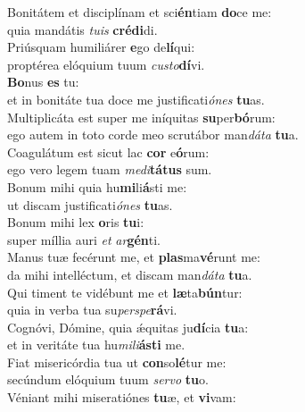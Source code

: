 \evenverse Bonitátem et disciplínam et sci\textbf{én}tiam \textbf{do}ce me:~\*\\
\evenverse quia mandátis \textit{tu}\textit{is} \textbf{cré}\textbf{di}di.\\
\oddverse Priúsquam humiliárer \textbf{e}go de\textbf{lí}qui:~\*\\
\oddverse proptérea elóquium tuum \textit{cu}\textit{sto}\textbf{dí}vi.\\
\evenverse \textbf{Bo}nus \textbf{es} tu:~\*\\
\evenverse et in bonitáte tua doce me justificati\textit{ó}\textit{nes} \textbf{tu}as.\\
\oddverse Multiplicáta est super me iníquitas \textbf{su}per\textbf{bó}rum:~\*\\
\oddverse ego autem in toto corde meo scrutábor man\textit{dá}\textit{ta} \textbf{tu}a.\\
\evenverse Coagulátum est sicut lac \textbf{cor} e\textbf{ó}rum:~\*\\
\evenverse ego vero legem tuam \textit{me}\textit{di}\textbf{tá}\textbf{tus} sum.\\
\oddverse Bonum mihi quia hu\textbf{mi}li\textbf{á}sti me:~\*\\
\oddverse ut discam justificati\textit{ó}\textit{nes} \textbf{tu}as.\\
\evenverse Bonum mihi lex \textbf{o}ris \textbf{tu}i:~\*\\
\evenverse super míllia auri \textit{et} \textit{ar}\textbf{gén}ti.\\
\oddverse Manus tuæ fecérunt me, et \textbf{plas}ma\textbf{vé}runt me:~\*\\
\oddverse da mihi intelléctum, et discam man\textit{dá}\textit{ta} \textbf{tu}a.\\
\evenverse Qui timent te vidébunt me et \textbf{læ}ta\textbf{bún}tur:~\*\\
\evenverse quia in verba tua su\textit{per}\textit{spe}\textbf{rá}vi.\\
\oddverse Cognóvi, Dómine, quia ǽquitas ju\textbf{dí}cia \textbf{tu}a:~\*\\
\oddverse et in veritáte tua hu\textit{mi}\textit{li}\textbf{á}\textbf{sti} me.\\
\evenverse Fiat misericórdia tua ut \textbf{con}so\textbf{lé}tur me:~\*\\
\evenverse secúndum elóquium tuum \textit{ser}\textit{vo} \textbf{tu}o.\\
\oddverse Véniant mihi miseratiónes \textbf{tu}æ, et \textbf{vi}vam:~\*\\
